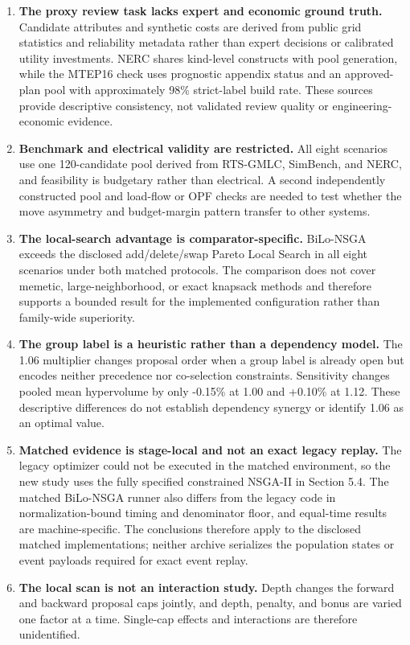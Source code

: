 \documentclass[applsci,article,submit,moreauthors]{Definitions/mdpi}
\begin{document}
\begin{enumerate}
\def\labelenumi{\arabic{enumi}.}
\item
  \textbf{The proxy review task lacks expert and economic ground truth.} Candidate attributes and synthetic costs are derived from public grid statistics and reliability metadata rather than expert decisions or calibrated utility investments. NERC shares kind-level constructs with pool generation, while the MTEP16 check uses prognostic appendix status and an approved-plan pool with approximately 98\% strict-label build rate. These sources provide descriptive consistency, not validated review quality or engineering-economic evidence.
\item
  \textbf{Benchmark and electrical validity are restricted.} All eight scenarios use one 120-candidate pool derived from RTS-GMLC, SimBench, and NERC, and feasibility is budgetary rather than electrical. A second independently constructed pool and load-flow or OPF checks are needed to test whether the move asymmetry and budget-margin pattern transfer to other systems.
\item
  \textbf{The local-search advantage is comparator-specific.} BiLo-NSGA exceeds the disclosed add/delete/swap Pareto Local Search in all eight scenarios under both matched protocols. The comparison does not cover memetic, large-neighborhood, or exact knapsack methods and therefore supports a bounded result for the implemented configuration rather than family-wide superiority.
\item
  \textbf{The group label is a heuristic rather than a dependency model.} The 1.06 multiplier changes proposal order when a group label is already open but encodes neither precedence nor co-selection constraints. Sensitivity changes pooled mean hypervolume by only -0.15\% at 1.00 and +0.10\% at 1.12. These descriptive differences do not establish dependency synergy or identify 1.06 as an optimal value.
\item
  \textbf{Matched evidence is stage-local and not an exact legacy replay.} The legacy optimizer could not be executed in the matched environment, so the new study uses the fully specified constrained NSGA-II in Section 5.4. The matched BiLo-NSGA runner also differs from the legacy code in normalization-bound timing and denominator floor, and equal-time results are machine-specific. The conclusions therefore apply to the disclosed matched implementations; neither archive serializes the population states or event payloads required for exact event replay.
\item
  \textbf{The local scan is not an interaction study.} Depth changes the forward and backward proposal caps jointly, and depth, penalty, and bonus are varied one factor at a time. Single-cap effects and interactions are therefore unidentified.
\end{enumerate}
\end{document}
